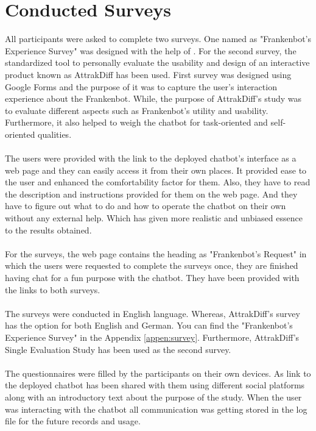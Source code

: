 \section{Conducted Surveys}
All participants were asked to complete two surveys. One named as "Frankenbot's Experience Survey" was designed with the help of \cite{MOLLER200726}\cite{itut}. For the second survey, the standardized tool to personally evaluate the usability and design of an interactive product known as AttrakDiff\cite{attrakdiff} has been used. First survey was designed using Google Forms and the purpose of it was to capture the user's interaction experience about the Frankenbot. While, the purpose of AttrakDiff's study was to evaluate different aspects such as Frankenbot's utility and usability. Furthermore, it also helped to weigh the chatbot for task-oriented and self-oriented qualities. 
\\~\\
The users were provided with the link to the deployed chatbot's interface as a web page and they can easily access it from their own places. It provided ease to the user and enhanced the comfortability factor for them. Also, they have to read the description and instructions provided for them on the web page. And they have to figure out what to do and how to operate the chatbot on their own without any external help. Which has given more realistic and unbiased essence to the results obtained.
\\~\\
For the surveys, the web page contains the heading as "Frankenbot's Request" in which the users were requested to complete the surveys once, they are finished having chat for a fun purpose with the chatbot. They have been provided with the links to both surveys.
\\~\\
The surveys were conducted in English language. Whereas, AttrakDiff's survey has the option for both English and German. You can find the "Frankenbot's Experience Survey" in the Appendix \ref{appen:survey}. Furthermore, AttrakDiff's Single Evaluation Study\cite{indeval} has been used as the second survey.
\\~\\
The questionnaires were filled by the participants on their own devices. As link to the deployed chatbot has been shared with them using different social platforms along with an introductory text about the purpose of the study. When the user was interacting with the chatbot all communication was getting stored in the log file for the future records and usage.

